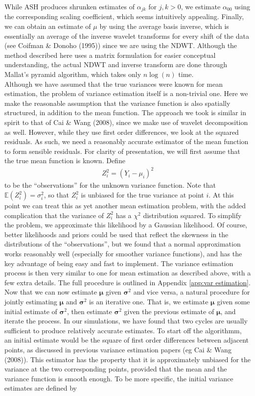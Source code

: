 \documentclass[12pt]{article}
\newcommand{\Ga}{\alpha}
\newcommand{\s}{\sigma}
\begin{document}
While ASH produces shrunken estimates of $\Ga_{jk}$ for $j,k>0$, we estimate $\Ga_{00}$ using the corresponding scaling coefficient, which seems intuitively appealing. Finally, we can obtain an estimate of $\mu$ by using the average basis inverse, which is essentially an average of the inverse wavelet transforms for every shift of the data (see Coifman \& Donoho (1995)) since we are using the NDWT. Although the method described here uses a matrix formulation for easier conceptual understanding, the actual NDWT and inverse transform are done through Mallat's pyramid algorithm, which takes only $n\log(n)$ time.\bigskip\\
Although we have assumed that the true variances were known for mean estimation, the problem of variance estimation itself is a non-trivial one. Here we make the reasonable assumption that the variance function is also spatially structured, in addition to the mean function. The approach we took is similar in spirit to that of Cai \& Wang (2008), since we make use of wavelet decomposition as well. However, while they use first order differences, we look at the squared residuals. As such, we need a reasonably accurate estimator of the mean function to form sensible residuals. For clarity of presentation, we will first assume that the true mean function is known. Define
\begin{eqnarray}\label{eq:varobs1}
Z_i^2=(Y_i-\mu_i)^2
\end{eqnarray}
to be the ``observations'' for the unknown variance function. Note that $\mathbb{E}(Z_i^2)=\s_i^2$, so that $Z_i^2$ is unbiased for the true variance at point $i$. At this point we can treat this as yet another mean estimation problem, with the added complication that the variance of $Z_i^2$ has a $\chi^2$ distribution squared. To simplify the problem, we approximate this likelihood by a Gaussian likelihood. Of course, better likelihoods and priors could be used that reflect the skewness in the distributions of the ``observations'', but we found that a normal approximation works reasonably well (especially for smoother variance functions), and has the key advantage of being easy and fast to implement. The variance estimation process is then very similar to one for mean estimation as described above, with a few extra details. The full procedure is outlined in Appendix \ref{app:var estimation}.\bigskip\\
Now that we can now estimate $\bm{\mu}$ given $\bm{\s}^2$ and vice versa, a natural procedure for jointly estimating $\bm{\mu}$ and $\bm{\s}^2$ is an iterative one. That is, we estimate $\bm{\mu}$ given some initial estimate of $\bm{\s}^2$, then estimate $\bm{\s}^2$ given the previous estimate of $\bm{\mu}$, and iterate the process. In our simulations, we have found that two cycles are usually sufficient to produce relatively accurate estimates. To start off the algorithmm, an initial estimate would be the square of first order differences between adjacent points, as discussed in previous variance estimation papers (eg Cai \& Wang (2008)). This estimator has the property that it is approximately unbiased for the variance at the two corresponding points, provided that the mean and the variance function is smooth enough. To be more specific, the initial variance estimates are defined by
\end{document}
